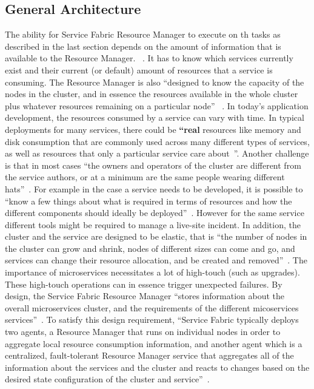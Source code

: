 \subsection{General Architecture}
The ability for Service Fabric Resource Manager 
to execute on th tasks as described in the last section depends on the 
amount of information that is available to the Resource Manager.
~\cite{hid-sp18-501-fig2and3}.  It has to
know which services currently exist and their current (or default)
amount of resources that a service is consuming. The Resource Manager
is also ``designed to know the capacity of the nodes in the cluster, and
in essence the resources available in the whole cluster plus whatever
resources remaining on a particular node''
~\cite{hid-sp18-501-fig2and3}. In today's application development, the
resources consumed by a service can vary with time. In typical 
deployments for many services,
there could be {\bf ``real} resources like memory
and disk consumption that are commonly used across many different
types of services, as well as resources that only a particular service
care about~\cite{hid-sp18-501-fig2and3}''.  Another challenge is 
that in most cases ``the owners and operators of the cluster are
different from the service authors, or at a minimum are
the same people wearing different hats''~\cite{hid-sp18-501-fig2and3}. 
For example in the case a service needs to be developed, it is possible
to ``know a few things about what is required in terms of
resources and how the different components should ideally be
deployed''~\cite{hid-sp18-501-fig2and3}. However for the same service
different tools might be required to manage a live-site incident. In
addition, the cluster and the service are designed to be elastic, that is
``the number of nodes in the cluster can grow and
shrink, nodes of different sizes can come and go, and services can
change their resource allocation, and be created and
removed''~\cite{hid-sp18-501-fig2and3}.  The importance of microservices
necessitates a lot of high-touch (such as upgrades).  These high-touch
operations can in essence trigger unexpected failures. By design, the
Service Fabric Resource Manager ``stores information about the overall
microservices cluster, and the requirements of the different
micoservices services''~\cite{hid-sp18-501-fig2and3}. To satisfy this
design requirement, ``Service
Fabric typically deploys two agents, a Resource Manager that runs on
individual nodes in order to aggregate local resource consumption
information, and another agent which is a centralized, fault-tolerant
Resource Manager service that aggregates all of the information about
the services and the cluster and reacts to changes based on the
desired state configuration of the cluster and
service''~\cite{hid-sp18-501-fig2and3}.

